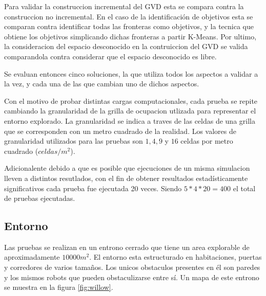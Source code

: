 Para validar la construccion incremental del GVD esta se compara contra la
construccion no incremental. En el caso de la identificación de objetivos esta se
comparan contra identificar todas las fronteras como objetivos, y la tecnica
que obtiene los objetivos simplicando dichas fronteras a partir K-Means. Por
ultimo, la consideracion del espacio desconocido en la contruiccion del GVD se
valida comparandola contra considerar que el espacio desconocido es libre. 

Se evaluan entonces cinco soluciones, la que utiliza todos los aspectos a
validar a la vez, y cada una de las que cambian uno de dichos aspectos.

Con el motivo de probar distintas cargas computacionales, cada prueba se repite
cambiando la granularidad de la grilla de ocupacion utlizada para representar
el entorno explorado. La granularidad se indica a traves de las celdas de una
grilla que se corresponden con un metro cuadrado de la realidad. Los valores de
granularidad utilizados para las pruebas son $1,4,9$ y $16$ celdas
por metro cuadrado ($celdas/m^2$). 

Adicionalente debido a que es posible que ejecuciones de un misma simulacion
lleven a distintos resutlados, con el fin de obtener resultados
estadísticamente significativos cada prueba fue ejecutada 20 veces. Siendo 
$5*4*20=400$ el total de pruebas ejecutadas.


\subsection{Entorno}
Las pruebas se realizan en un entrono cerrado que tiene un area explorable de
aproximadamente $10000m^2$. El entorno esta estructurado en habitaciones,
puertas y corredores de varios tamaños. Los unicos obstaculos presentes en él
son paredes y los mismos robots que pueden obstaculizarse entre
sí. Un mapa de este entrono se muestra en la figura
\ref{fig:willow}.

